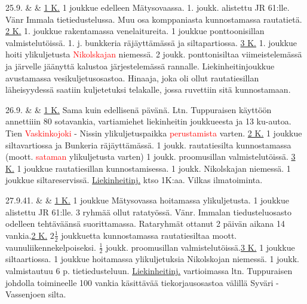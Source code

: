 \documentclass[11pt,a5paper,oneside]{book}
\begin{document}
25.9. & & \underline{1 K.} 1 joukkue edelleen Mätysovaassa. 1. joukk. alistettu JR 61:lle. Vänr Immala tietiedustelussa. Muu osa komppaniasta kunnostamassa rautatietä. \newline\newline \underline{2 K.} 1. joukkue rakentamassa venelaitureita. 1 joukkue ponttoonisillan valmistelutöissä. 1. j. bunkkeria räjäyttämässä ja siltapartiossa. \newline\newline \underline{3 K.} 1. joukkue hoiti ylikuljetusta \textcolor{red}{Nikolskajan} niemessä. 2 joukk. ponttonisiltaa viimeistelemässä ja järvelle jäänyttä kalustoa järjestelemässä rannalle. \newline\newline Liekinheitinjoukkue avustamassa vesikuljetusosastoa. Hinaaja, joka oli ollut rautatiesillan läheisyydessä saatiin kuljetetuksi telakalle, jossa ruvettiin sitä kunnostamaan. \\

\newpage

26.9. & & \underline{1 K.} Sama kuin edellisenä pävänä. Ltn. Tuppuraisen käyttöön annettiiin 80 sotavankia, vartiamiehet liekinheitin joukkueesta ja 13 ku-autoa. Tien \textcolor{red}{Vaskinkojoki} - Nissin ylikuljetuspaikka \textcolor{red}{perustamista} varten. \newline\newline \underline{2 K.} 1 joukkue siltavartiossa ja Bunkeria räjäyttämässä. 1 joukk. rautatiesilta kunnostamassa (moott. \textcolor{red}{sataman} ylikuljetusta varten) 1 joukk. proomusillan valmistelutöissä. \newline\newline \underline{3 K.} 1 joukkue rautatiesillan kunnostamisessa. 1 joukk. Nikolskajan niemessä. 1 joukkue siltareservissä. \newline\newline \underline{Liekinheitinj.} ktso 1K:aa. \newline\newline Vilkas ilmatoiminta. \\

\taulustop


27.9.41. & & \underline{1 K.} 1 joukkue Mätysovassa hoitamassa ylikuljetusta. 1 joukkue alistettu JR 61:lle. 3 ryhmää ollut ratatyössä. Vänr. Immalan tiedusteluosasto odelleen tehtäväänsä suorittamassa. Rataryhmät ottanut 2 päivän aikana 14 vankia.\newline \underline{2 K.} $2\frac{1}{2}$ joukkuetta kunnostamassa rautatiesiltaa moott. vaunuliikennekelpoiseksi. $\frac{1}{2}$ joukk. proomusillan valmistelutöissä.\newline\newline \underline{3 K.} 1 joukkue siltaartiossa. 1 joukkue hoitamassa ylikuljetuksia Nikolskojan niemessä. 1 joukk. valmistautuu 6 p. tietiedusteluun. \newline\newline \underline{Liekinheitinj.} vartioimassa ltn. Tuppuraisen johdolla toimineelle 100 vankia käsittävää tiekorjausosastoa välillä Syväri - Vassenjoen silta. \\
\end{document}
